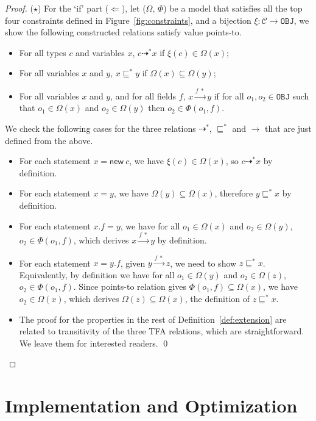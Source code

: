 \documentclass[runningheads]{llncs}
\newcommand{\keyword}[1]{\mathsf{#1}}
\newcommand{\kwnew}[0]{\keyword{new}}
\newcommand\Obj{\mathtt{OBJ}}
\newcommand{\VPT}{\Omega}
\newcommand{\HPT}{\Phi}
\newcommand{\Class}{\mathcal{C}}
\newcommand{\less}{\sqsubseteq}
\newcommand{\tflow}{\dashrightarrow}
\newcommand{\hflow}{\longrightarrow}
\newcommand{\lhflow}[1]{\stackrel{#1}{\hflow}}
\begin{document}
\begin{proof}
\medskip

($\star$) For the `if' part ($\Leftarrow$), let ($\VPT$, $\HPT$) be a model that satisfies all the top four constraints defined in Figure~\ref{fig:constraints}, and a bijection $\xi:\Class\rightarrow\Obj$, we show the following constructed relations satisfy value points-to.
\begin{itemize}
  \item For all types $c$ and variables $x$, $c\tflow^* x$ if $\xi(c)\in\VPT(x)$;
  \item For all variables $x$ and $y$, $x\less^*y$ if $\VPT(x)\subseteq\VPT(y)$;
  \item For all variables $x$ and $y$, and for all fields $f$, $x\lhflow{f\ *}y$ if for all $o_1,o_2\in\Obj$ such that $o_1\in\VPT(x)$ and $o_2\in\VPT(y)$ then $o_2\in\HPT(o_1,f)$.
\end{itemize}
We check the following cases for the three relations $\tflow^*$, $\less^*$ and $\rightarrow$ that are just defined from the above.
\begin{itemize}
\item For each statement $x = \kwnew\ c$, we have $\xi(c)\in\VPT(x)$, so $c\tflow^* x$ by definition.
\item For each statement $x = y$, we have $\VPT(y)\subseteq\VPT(x)$, therefore $y\less^*x$ by definition.
\item For each statement $x.f = y$, we have for all $o_1\in\VPT(x)$ and $o_2\in\VPT(y)$, $o_2\in\HPT(o_1,f)$, which derives $x\lhflow{f\ *}y$ by definition.
\item  For each statement $x = y.f$, given $y\lhflow{f\ *}z$, we need to show $z\less^* x$. Equivalently, by definition we have for all $o_1\in\VPT(y)$ and $o_2\in\VPT(z)$, $o_2\in\HPT(o_1,f)$. Since points-to relation gives $\HPT(o_1,f)\subseteq\VPT(x)$, we have $o_2\in\VPT(x)$, which derives $\VPT(z)\subseteq\VPT(x)$, the definition of $z\less^* x$.
\item The proof for the properties in the rest of Definition~\ref{def:extension} are related to transitivity of the three TFA relations, which are straightforward. We leave them for interested readers. \qed
\end{itemize}
\end{proof}


\section{Implementation and Optimization}\label{sec:minimization}
\end{document}
